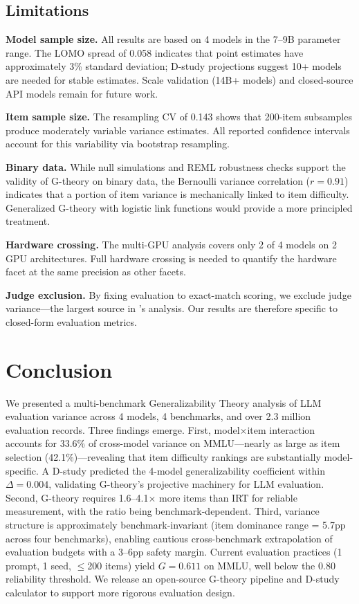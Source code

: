 \documentclass[letterpaper]{article}
\begin{document}
\subsection{Limitations}

\textbf{Model sample size.}
All results are based on 4 models in the 7--9B parameter range.
The LOMO spread of 0.058 indicates that point estimates have approximately 3\% standard deviation; D-study projections suggest 10+ models are needed for stable estimates.
Scale validation (14B+ models) and closed-source API models remain for future work.

\textbf{Item sample size.}
The resampling CV of 0.143 shows that 200-item subsamples produce moderately variable variance estimates.
All reported confidence intervals account for this variability via bootstrap resampling.

\textbf{Binary data.}
While null simulations and REML robustness checks support the validity of G-theory on binary data, the Bernoulli variance correlation ($r = 0.91$) indicates that a portion of item variance is mechanically linked to item difficulty.
Generalized G-theory with logistic link functions \citep{jiang2017generalized} would provide a more principled treatment.

\textbf{Hardware crossing.}
The multi-GPU analysis covers only 2 of 4 models on 2 GPU architectures.
Full hardware crossing is needed to quantify the hardware facet at the same precision as other facets.

\textbf{Judge exclusion.}
By fixing evaluation to exact-match scoring, we exclude judge variance---the largest source in \citet{mesting2026generalizability}'s analysis.
Our results are therefore specific to closed-form evaluation metrics.

\section{Conclusion}

We presented a multi-benchmark Generalizability Theory analysis of LLM evaluation variance across 4 models, 4 benchmarks, and over 2.3 million evaluation records.
Three findings emerge.
First, model$\times$item interaction accounts for 33.6\% of cross-model variance on MMLU---nearly as large as item selection (42.1\%)---revealing that item difficulty rankings are substantially model-specific.
A D-study predicted the 4-model generalizability coefficient within $\Delta = 0.004$, validating G-theory's projective machinery for LLM evaluation.
Second, G-theory requires 1.6--4.1$\times$ more items than IRT for reliable measurement, with the ratio being benchmark-dependent.
Third, variance structure is approximately benchmark-invariant (item dominance range = 5.7pp across four benchmarks), enabling cautious cross-benchmark extrapolation of evaluation budgets with a 3--6pp safety margin.
Current evaluation practices (1 prompt, 1 seed, $\leq$200 items) yield $G = 0.611$ on MMLU, well below the 0.80 reliability threshold.
We release an open-source G-theory pipeline and D-study calculator to support more rigorous evaluation design.
\end{document}
